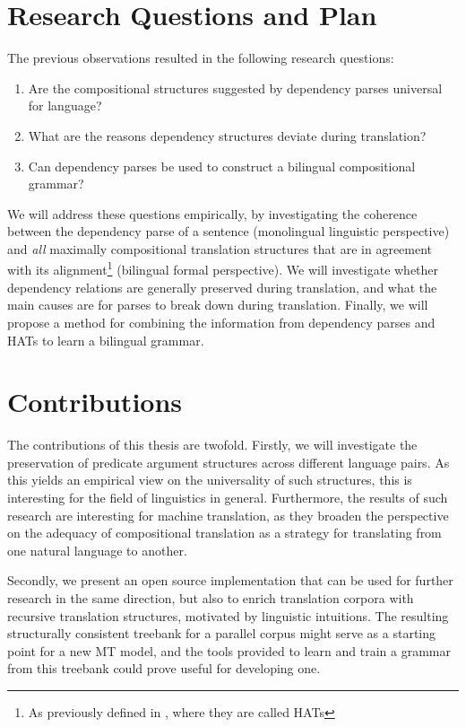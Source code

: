 \section*{Research Questions and Plan}

The previous observations resulted in the following research questions:\begin{enumerate}
\item Are the compositional structures suggested by dependency parses universal for language?
\item What are the reasons dependency structures deviate during translation?
\item Can dependency parses be used to construct a bilingual compositional grammar?
\end{enumerate}

We will address these questions empirically, by investigating the coherence between the dependency parse of a sentence (monolingual linguistic perspective) and \textit{all} maximally compositional translation structures that are in agreement with its alignment\footnote{As previously defined in \cite{simaan2013hats}, where they are called HATs} (bilingual formal perspective). We will investigate whether dependency relations are generally preserved during translation, and what the main causes are for parses to break down during translation. Finally, we will propose a method for combining the information from dependency parses and HATs to learn a bilingual grammar.

\section*{Contributions}
The contributions of this thesis are twofold. Firstly, we will investigate the preservation of predicate argument structures across different language pairs. As this yields an empirical view on the universality of such structures, this is interesting for the field of linguistics in general. Furthermore, the results of such research are interesting for machine translation, as they broaden the perspective on the adequacy of compositional translation as a strategy for translating from one natural language to another.

Secondly, we present an open source implementation that can be used for further research in the same direction, but also to enrich translation corpora with recursive translation structures, motivated by linguistic intuitions. The resulting structurally consistent treebank for a parallel corpus might serve as a starting point for a new MT model, and the tools provided to learn and train a grammar from this treebank could prove useful for developing one.

